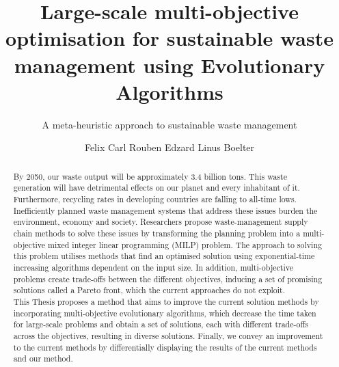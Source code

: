 \documentclass[mscthesis, 11pt]{usiinfthesis}
\title{Large-scale multi-objective optimisation for sustainable waste management using Evolutionary Algorithms} %
\subtitle{A meta-heuristic approach to sustainable waste management} %
\author{Felix Carl Rouben Edzard Linus Boelter} %
\theoremstyle{newdefinition}
\begin{document}
\maketitle %

\frontmatter %


\begin{abstract}
    By 2050, our waste output will be approximately 3.4 billion tons. This waste generation will have detrimental effects on our planet and every inhabitant of it. Furthermore, recycling rates in developing countries are falling to all-time lows. Inefficiently planned waste management systems that address these issues burden the environment, economy and society. Researchers propose waste-management supply chain methods to solve these issues by transforming the planning problem into a multi-objective mixed integer linear programming (MILP) problem. The approach to solving this problem utilises methods that find an optimised solution using exponential-time increasing algorithms dependent on the input size. In addition, multi-objective problems create trade-offs between the different objectives, inducing a set of promising solutions called a Pareto front, which the current approaches do not exploit. \\
    This Thesis proposes a method that aims to improve the current solution methods by incorporating multi-objective evolutionary algorithms, which decrease the time taken for large-scale problems and obtain a set of solutions, each with different trade-offs across the objectives, resulting in diverse solutions. Finally, we convey an improvement to the current methods by differentially displaying the results of the current methods and our method.
\end{abstract}


\tableofcontents 
\listoffigures %
\listoftables %
\listofalgorithms

\mainmatter
\end{document}
